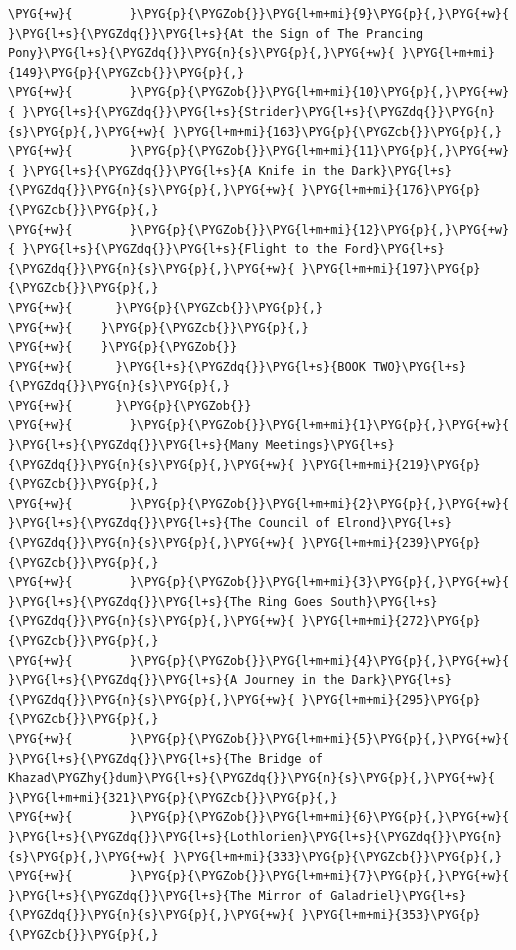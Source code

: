 \begin{codeblockbg}
\begin{Verbatim}[commandchars=\\\{\},breaklines=true,breakanywhere=true,fontsize=\codefont,xleftmargin=17bp]
\PYG{+w}{        }\PYG{p}{\PYGZob{}}\PYG{l+m+mi}{9}\PYG{p}{,}\PYG{+w}{ }\PYG{l+s}{\PYGZdq{}}\PYG{l+s}{At the Sign of The Prancing Pony}\PYG{l+s}{\PYGZdq{}}\PYG{n}{s}\PYG{p}{,}\PYG{+w}{ }\PYG{l+m+mi}{149}\PYG{p}{\PYGZcb{}}\PYG{p}{,}
\PYG{+w}{        }\PYG{p}{\PYGZob{}}\PYG{l+m+mi}{10}\PYG{p}{,}\PYG{+w}{ }\PYG{l+s}{\PYGZdq{}}\PYG{l+s}{Strider}\PYG{l+s}{\PYGZdq{}}\PYG{n}{s}\PYG{p}{,}\PYG{+w}{ }\PYG{l+m+mi}{163}\PYG{p}{\PYGZcb{}}\PYG{p}{,}
\PYG{+w}{        }\PYG{p}{\PYGZob{}}\PYG{l+m+mi}{11}\PYG{p}{,}\PYG{+w}{ }\PYG{l+s}{\PYGZdq{}}\PYG{l+s}{A Knife in the Dark}\PYG{l+s}{\PYGZdq{}}\PYG{n}{s}\PYG{p}{,}\PYG{+w}{ }\PYG{l+m+mi}{176}\PYG{p}{\PYGZcb{}}\PYG{p}{,}
\PYG{+w}{        }\PYG{p}{\PYGZob{}}\PYG{l+m+mi}{12}\PYG{p}{,}\PYG{+w}{ }\PYG{l+s}{\PYGZdq{}}\PYG{l+s}{Flight to the Ford}\PYG{l+s}{\PYGZdq{}}\PYG{n}{s}\PYG{p}{,}\PYG{+w}{ }\PYG{l+m+mi}{197}\PYG{p}{\PYGZcb{}}\PYG{p}{,}
\PYG{+w}{      }\PYG{p}{\PYGZcb{}}\PYG{p}{,}
\PYG{+w}{    }\PYG{p}{\PYGZcb{}}\PYG{p}{,}
\PYG{+w}{    }\PYG{p}{\PYGZob{}}
\PYG{+w}{      }\PYG{l+s}{\PYGZdq{}}\PYG{l+s}{BOOK TWO}\PYG{l+s}{\PYGZdq{}}\PYG{n}{s}\PYG{p}{,}
\PYG{+w}{      }\PYG{p}{\PYGZob{}}
\PYG{+w}{        }\PYG{p}{\PYGZob{}}\PYG{l+m+mi}{1}\PYG{p}{,}\PYG{+w}{ }\PYG{l+s}{\PYGZdq{}}\PYG{l+s}{Many Meetings}\PYG{l+s}{\PYGZdq{}}\PYG{n}{s}\PYG{p}{,}\PYG{+w}{ }\PYG{l+m+mi}{219}\PYG{p}{\PYGZcb{}}\PYG{p}{,}
\PYG{+w}{        }\PYG{p}{\PYGZob{}}\PYG{l+m+mi}{2}\PYG{p}{,}\PYG{+w}{ }\PYG{l+s}{\PYGZdq{}}\PYG{l+s}{The Council of Elrond}\PYG{l+s}{\PYGZdq{}}\PYG{n}{s}\PYG{p}{,}\PYG{+w}{ }\PYG{l+m+mi}{239}\PYG{p}{\PYGZcb{}}\PYG{p}{,}
\PYG{+w}{        }\PYG{p}{\PYGZob{}}\PYG{l+m+mi}{3}\PYG{p}{,}\PYG{+w}{ }\PYG{l+s}{\PYGZdq{}}\PYG{l+s}{The Ring Goes South}\PYG{l+s}{\PYGZdq{}}\PYG{n}{s}\PYG{p}{,}\PYG{+w}{ }\PYG{l+m+mi}{272}\PYG{p}{\PYGZcb{}}\PYG{p}{,}
\PYG{+w}{        }\PYG{p}{\PYGZob{}}\PYG{l+m+mi}{4}\PYG{p}{,}\PYG{+w}{ }\PYG{l+s}{\PYGZdq{}}\PYG{l+s}{A Journey in the Dark}\PYG{l+s}{\PYGZdq{}}\PYG{n}{s}\PYG{p}{,}\PYG{+w}{ }\PYG{l+m+mi}{295}\PYG{p}{\PYGZcb{}}\PYG{p}{,}
\PYG{+w}{        }\PYG{p}{\PYGZob{}}\PYG{l+m+mi}{5}\PYG{p}{,}\PYG{+w}{ }\PYG{l+s}{\PYGZdq{}}\PYG{l+s}{The Bridge of Khazad\PYGZhy{}dum}\PYG{l+s}{\PYGZdq{}}\PYG{n}{s}\PYG{p}{,}\PYG{+w}{ }\PYG{l+m+mi}{321}\PYG{p}{\PYGZcb{}}\PYG{p}{,}
\PYG{+w}{        }\PYG{p}{\PYGZob{}}\PYG{l+m+mi}{6}\PYG{p}{,}\PYG{+w}{ }\PYG{l+s}{\PYGZdq{}}\PYG{l+s}{Lothlorien}\PYG{l+s}{\PYGZdq{}}\PYG{n}{s}\PYG{p}{,}\PYG{+w}{ }\PYG{l+m+mi}{333}\PYG{p}{\PYGZcb{}}\PYG{p}{,}
\PYG{+w}{        }\PYG{p}{\PYGZob{}}\PYG{l+m+mi}{7}\PYG{p}{,}\PYG{+w}{ }\PYG{l+s}{\PYGZdq{}}\PYG{l+s}{The Mirror of Galadriel}\PYG{l+s}{\PYGZdq{}}\PYG{n}{s}\PYG{p}{,}\PYG{+w}{ }\PYG{l+m+mi}{353}\PYG{p}{\PYGZcb{}}\PYG{p}{,}

\end{Verbatim}
\end{codeblockbg}
